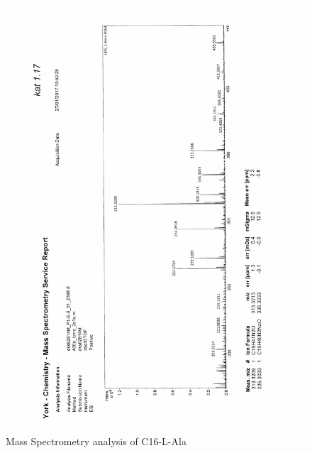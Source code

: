 \begin{figure}[ht!]
\centering
\includegraphics[scale=0.75]{Mass_Spec/KAT1_17.PDF}
\caption{Mass Spectrometry analysis of C16-L-Ala}
\end{figure}

